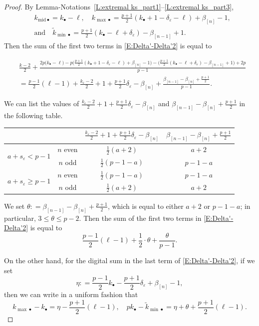 \documentclass[12pt]{amsart}
\theoremstyle{definition}
\numberwithin{equation}{subsection}
\newcommand{\midd}{\mathrm{mid}}
\begin{document}
\begin{proof}
By Lemma-Notations~\ref{L:extremal ks_part1}--\ref{L:extremal ks_part3}, 
\begin{align*}
&k_{\midd \bullet} =k_{\bullet} -\ell, \quad k_{{\max}\bullet} =\tfrac {p+1}2 (k_{\bullet}+1-\delta_\varepsilon -\ell) + \beta_{[n]}-1,
\\
& \textrm{and} \quad \tilde k_{{\min}\bullet}  =  \tfrac{p+1}2 (k_{\bullet}-\ell+\delta_\varepsilon) - \beta_{[n-1]}+1.
\end{align*}
Then the sum of the first two terms in \eqref{E:Delta'-Delta'2} is equal to
\begin{small}
\begin{align*}
&\frac{k-2}2 +
\frac{2 p\big( k_\bullet -\ell\big)  -p \big(\tfrac{p+1}2(k_\bullet+1 - \delta_\varepsilon -\ell) + \beta_{[n]}-1\big) 
- \big(\tfrac{p+1}2(k_\bullet - \ell+ \delta_\varepsilon) - \beta_{[n-1]}+1 \big)+2p}{p-1}
\\
&= \frac{p-1}2 (\ell-1)+ \frac{k_\varepsilon - 2}2+1+\frac{p+1}2 \delta_\varepsilon -\beta_{[n]}+ \frac{\beta_{[n-1]}-\beta_{[n]}+\frac{p+1}2}{p-1}.
\end{align*}\end{small}We can list the values of $\frac{k_\varepsilon - 2}2+1+\frac{p+1}2 \delta_\varepsilon -\beta_{[n]}$ and $\beta_{[n-1]}-\beta_{[n]}+\frac{p+1}2$ in the following table.
\begin{center}
\begin{tabular}{|c|c|c|c|}
\hline
& &$\frac{k_\varepsilon - 2}2+1+\frac{p+1}2 \delta_\varepsilon -\beta_{[n]}$ & $\beta_{[n-1]}-\beta_{[n]}+\frac{p+1}2$
\\
\hline
\multirow{2}{*}{$a+s_\varepsilon < p-1$} & $n$ even & $\frac 12(a+2)$ & $a+2$
\\
\cline{2-4}
& $n$ odd & $\frac 12(p-1-a)$ & $p-1-a$
\\
\hline 
\multirow{2}{*}{
$a+s_\varepsilon \geq p-1$} & $n$ even & $\frac 12(p-1-a)$ & $p-1-a$
\\
\cline{2-4} & $n$ odd & $\frac 12(a+2)$ & $a+2$
\\
\hline
\end{tabular}
\end{center}
We set $\theta: = \beta_{[n-1]}-\beta_{[n]}+\frac{p+1}2$, which is equal to either $a+2$ or $p-1-a$; in particular, $3\leq \theta \leq p-2$. Then the sum of the first two terms in \eqref{E:Delta'-Delta'2} is equal to
$$
\frac{p-1}2(\ell-1) + \frac 12\cdot  \theta + \frac{\theta}{p-1}.
$$


On the other hand, 
for the digital sum in the last term of \eqref{E:Delta'-Delta'2}, if we set
\begin{equation}
\label{E:eta}
\eta: = \frac{p-1}2k_\bullet -\frac{p+1}2\delta_\varepsilon + \beta_{[n]}-1,
\end{equation}
then we can write in a uniform fashion that
\begin{equation}
\label{E:kmax - k}
k_{{\max}\bullet}-k_\bullet = \eta - \frac{p+1}2 (\ell-1) , \quad pk_\bullet -\tilde k_{{\min}\bullet} =\eta+\theta +\frac{p+1}2(\ell-1).
\end{equation}


\end{proof}
\end{document}
